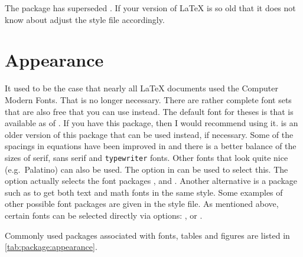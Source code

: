 The package  has superseded .
If your version of \LaTeX{} is so old that it does not know about
 adjust the  style file accordingly.

\section{Appearance}%
\label{sec:package:appearance}

It used to be the case that nearly all \LaTeX{} documents used the
Computer Modern Fonts. That is no longer necessary. There are rather
complete font sets that are also free that you can use instead.
The default font for theses is  that is available as of .
If you have this package, then I would recommend using it.
 is an older version of this package that can be used instead, if necessary.
Some of the spacings in equations have been improved in 
and there is a better balance of the sizes of serif, \textsf{sans serif} and \texttt{typewriter} fonts.
Other fonts that look quite nice (e.g.\ Palatino) can also be used.
The option  in  can be used to select this.
The option actually selects the font packages ,  and .
Another alternative is a package such as  
to get both text and math fonts in the same style. 
Some examples of other possible font packages are given in the style file.
As mentioned above, certain fonts can be selected directly via options:
,  or .

Commonly used packages associated with fonts, tables and
figures are listed in \cref{tab:package:appearance}.

